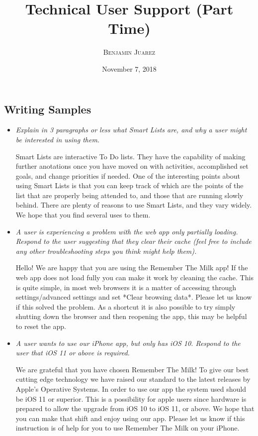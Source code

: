 \documentclass[twoside]{article} %
\title{Technical User Support (Part Time)} %
\author{%
\textsc{Benjamin Juarez}
}
\date{November 7, 2018} %
\begin{document}
\maketitle

\subsection*{Writing Samples}

\begin{itemize}
 \item \textit{Explain in 3 paragraphs or less what Smart Lists are, and why a user might be interested in using them.}
 
Smart Lists are interactive To Do lists. They have the capability of making further anotations once you have moved on with activities, accomplished set goals, and change priorities if needed. One of the interesting points about using Smart Lists is that you can keep track of which are the points of the list that are properly being attended to, and those that are running slowly behind. There are plenty of reasons to use Smart Lists, and they vary widely. We hope that you find several uses to them.
 
 \item \textit{A user is experiencing a problem with the web app only partially loading. Respond to the user suggesting that they clear their cache (feel free to include any other troubleshooting steps you think might help them).}

Hello! We are happy that you are using the Remember The Milk app! If the web app does not load fully you can make it work by cleaning the cache. This is quite simple, in most web browsers it is a matter of accessing through settings/advanced settings and set *Clear browsing data*. Please let us know if this solved the problem. As a shortcut it is also possible to try simply shutting down the browser and then reopening the app, this may be helpful to reset the app. 
 
 \item \textit{A user wants to use our iPhone app, but only has iOS 10. Respond to the user that iOS 11 or above is required.}

We are grateful that you have chosen Remember The Milk! To give our best cutting edge technology we have raised our standard to the latest releases by Apple's Operative Systems. In order to use our app the system used should be iOS 11 or superior. This is a possibility for apple users since hardware is prepared to allow the upgrade from iOS 10 to iOS 11, or above. We hope that you can make that shift and enjoy using our app. Please let us know if this instruction is of help for you to use Remember The Milk on your iPhone.
 
 \end{itemize}
\end{document}
